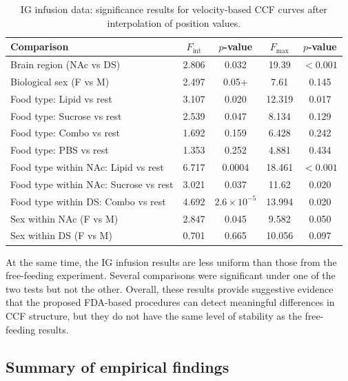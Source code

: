\documentclass[12pt]{article}
\begin{document}
\begin{table}[ht]
\centering
\caption{IG infusion data: significance results for velocity-based CCF curves after interpolation of position values.}
\label{tab:ig_modified}
\begin{tabular}{lcccc}
\hline
Comparison & \(F_{\mathrm{int}}\) & \(p\)-value & \(F_{\max}\) & \(p\)-value \\
\hline
Brain region (NAc vs DS) & 2.806 & 0.032 & 19.39 & \(<0.001\) \\
Biological sex (F vs M) & 2.497 & 0.05+ & 7.61 & 0.145 \\
\hline
Food type: Lipid vs rest & 3.107 & 0.020 & 12.319 & 0.017 \\
Food type: Sucrose vs rest & 2.539 & 0.047 & 8.134 & 0.129 \\
Food type: Combo vs rest & 1.692 & 0.159 & 6.428 & 0.242 \\
Food type: PBS vs rest & 1.353 & 0.252 & 4.881 & 0.434 \\
\hline
Food type within NAc: Lipid vs rest & 6.717 & 0.0004 & 18.461 & \(<0.001\) \\
Food type within NAc: Sucrose vs rest & 3.021 & 0.037 & 11.62 & 0.020 \\
Food type within DS: Combo vs rest & 4.692 & \(2.6\times 10^{-5}\) & 13.994 & 0.020 \\
\hline
Sex within NAc (F vs M) & 2.847 & 0.045 & 9.582 & 0.050 \\
Sex within DS (F vs M) & 0.701 & 0.665 & 10.056 & 0.097 \\
\hline
\end{tabular}
\end{table}

At the same time, the IG infusion results are less uniform than those from the free-feeding experiment. Several comparisons were significant under one of the two tests but not the other.
Overall, these results provide suggestive evidence that the proposed FDA-based procedures can detect meaningful differences in CCF structure, but they do not have the same level of stability as the free-feeding results.

\subsection{Summary of empirical findings}
\end{document}
